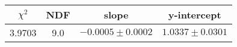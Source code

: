 \begin{tabular}{|c|c|c|c|}

\hline
$\chi^{2}$ & NDF & slope & y-intercept  \\
\hline
3.9703 & 9.0 & $-0.0005\pm0.0002$ & $1.0337\pm0.0301$ \\
\hline

\end{tabular}